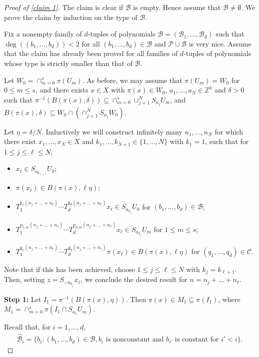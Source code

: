 \documentclass[10pt,a4paper]{amsart}
\newcommand{\Z}{\mathbb{Z}}
\newcommand{\cB}{{\mathcal B}}
\newcommand{\cC}{{\mathcal C}}
\newcommand{\cP}{{\mathcal P}}
\begin{document}
\begin{proof}[Proof of \cref{claim 1}]
    The claim is clear if $\cB$ is empty. Hence assume that $\cB\neq\emptyset$. We prove the claim by induction on the type of $\cB$.
    
    Fix a nonempty family of $d$-tuples of polynomials $\cB = (\cB_1,\dots,\cB_d)$ such that $\deg((b_1,\dots,b_d))<2$ for all $(b_1,\dots,b_d)\in \cB$ and $\cP\cup\cB$ is very nice. Assume that the claim has already been proved for all families of $d$-tuples of polynomials whose type is strictly smaller than that of $\cB$.

    Let $W_0 = \cap_{m=0}^{s}\pi(U_m)$. As before, we may assume that $\pi(U_m)=W_0$ for $0\leq m \leq s$, and there exists $x\in X$ with $\pi(x)\in W_0$, $a_1,\dots,a_N\in \Z^{k}$ and $\delta>0$ such that $\pi^{-1}(B(\pi(x),\delta))\subseteq\cap_{m=0}^{s}\cup_{j=1}^{N}S_{a_j}U_m$, and $B(\pi(x),\delta)\subseteq W_0 \cap \left(\cap_{j=1}^{N}S_{a_j}W_0 \right)$.

    Let $\eta=\delta/N$. Inductively we will construct infinitely many $n_1,\dots,n_N$ for which there exist $x_1,\dots,x_N\in X$ and $k_1,\dots,k_{N+1}\in \{1,\dots,N\}$ with $k_1=1$, such that for $1\leq j \leq \ell\leq N$,\begin{itemize}
        \item $x_\ell\in S_{a_{k_{\ell+1}}}U_0$;
        \item $\pi(x_\ell)\in B(\pi(x),\ell\eta)$;
        \item $T_1^{b_1(n_j+\dots+n_\ell)}\cdots T_d^{b_d(n_j+\dots+n_\ell)}x_\ell\in S_{a_{k_j}}U_0$ for $(b_1,\dots,b_d)\in \cB$;
        \item $T_1^{p_{1,m}(n_j+\dots+n_\ell)}\cdots T_d^{p_{d,m}(n_j+\dots+n_\ell)}x_\ell \in S_{a_{k_j}}U_m$ for $1\leq m\leq s$;
        \item $T_1^{q_1(n_j+\dots+n_\ell)}\cdots T_d^{q_d(n_j+\dots+n_\ell)}\pi(x_\ell)\in B(\pi(x),\ell\eta)$ for $(q_1,\dots,q_d)\in \cC$.
    \end{itemize} 

    Note that if this has been achieved, choose $1\leq j \leq \ell\leq N$ with $k_j = k_{\ell+1}$. Then, setting $z = S_{-a_{k_j}}x_{\ell}$, we conclude the desired result for $n=n_j+\dots+n_\ell$.

    \textbf{Step 1:} Let $I_1 = \pi^{-1}(B(\pi(x),\eta))$. Then $\pi(x)\in M_1\subseteq \pi(I_1)$, where $M_1 = \cap_{m=0}^{s}\pi(I_1\cap S_{a_1}U_m)$.

    Recall that, for $i=1,\dots, d$,\begin{align*}
        \widehat{\cB}_i=\{b_i\colon (b_1,\dots,b_d)\in \cB, b_i \text{ is nonconstant and }  b_{i'} \text{ is constant for } i'<i\}.
    \end{align*}


\end{proof}
\end{document}
